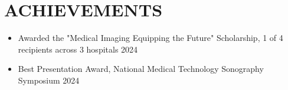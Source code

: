 
\section{\textcolor{airforceblue}{ACHIEVEMENTS}}
    \begin{itemize}[leftmargin=0.15in, itemsep=0pt, parsep=0pt]
        \item Awarded the "Medical Imaging Equipping the Future" Scholarship, 1 of 4 recipients across 3 hospitals \hfill 2024
        \item Best Presentation Award, National Medical Technology Sonography Symposium \hfill 2024 
    \end{itemize}

\vspace{-12pt}
